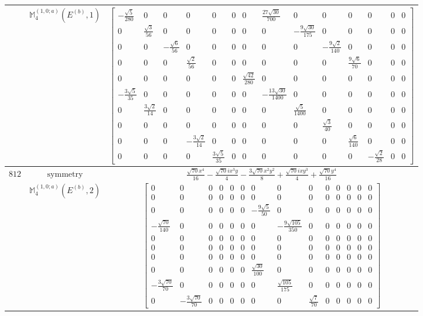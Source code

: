 \documentclass[fleqn,8pt,landscape]{jsarticle}
\begin{document}
\begin{longtable}{ccc}
$  $ & $ \mathbb{M}_{4}^{(1,0;a)}(E^{(b)},1) $ & $ \begin{bmatrix} - \frac{\sqrt{5}}{280} & 0 & 0 & 0 & 0 & 0 & 0 & \frac{27 \sqrt{30}}{700} & 0 & 0 & 0 & 0 & 0 & 0 \\ 0 & \frac{\sqrt{3}}{56} & 0 & 0 & 0 & 0 & 0 & 0 & - \frac{9 \sqrt{30}}{175} & 0 & 0 & 0 & 0 & 0 \\ 0 & 0 & - \frac{\sqrt{6}}{56} & 0 & 0 & 0 & 0 & 0 & 0 & - \frac{9 \sqrt{2}}{140} & 0 & 0 & 0 & 0 \\ 0 & 0 & 0 & \frac{\sqrt{2}}{56} & 0 & 0 & 0 & 0 & 0 & 0 & \frac{9 \sqrt{6}}{70} & 0 & 0 & 0 \\ 0 & 0 & 0 & 0 & 0 & 0 & \frac{\sqrt{42}}{280} & 0 & 0 & 0 & 0 & 0 & 0 & 0 \\ - \frac{3 \sqrt{5}}{35} & 0 & 0 & 0 & 0 & 0 & 0 & - \frac{13 \sqrt{30}}{1400} & 0 & 0 & 0 & 0 & 0 & 0 \\ 0 & \frac{3 \sqrt{2}}{14} & 0 & 0 & 0 & 0 & 0 & 0 & \frac{\sqrt{5}}{1400} & 0 & 0 & 0 & 0 & 0 \\ 0 & 0 & 0 & 0 & 0 & 0 & 0 & 0 & 0 & \frac{\sqrt{3}}{40} & 0 & 0 & 0 & 0 \\ 0 & 0 & 0 & - \frac{3 \sqrt{2}}{14} & 0 & 0 & 0 & 0 & 0 & 0 & \frac{\sqrt{6}}{140} & 0 & 0 & 0 \\ 0 & 0 & 0 & 0 & \frac{3 \sqrt{5}}{35} & 0 & 0 & 0 & 0 & 0 & 0 & - \frac{\sqrt{2}}{28} & 0 & 0 \end{bmatrix} $ \\ \hline
$ 812 $ & $ \text{symmetry} $ & $ \frac{\sqrt{70} x^{4}}{16} - \frac{\sqrt{70} i x^{3} y}{4} - \frac{3 \sqrt{70} x^{2} y^{2}}{8} + \frac{\sqrt{70} i x y^{3}}{4} + \frac{\sqrt{70} y^{4}}{16} $ \\
$  $ & $ \mathbb{M}_{4}^{(1,0;a)}(E^{(b)},2) $ & $ \begin{bmatrix} 0 & 0 & 0 & 0 & 0 & 0 & 0 & 0 & 0 & 0 & 0 & 0 & 0 & 0 \\ 0 & 0 & 0 & 0 & 0 & 0 & 0 & 0 & 0 & 0 & 0 & 0 & 0 & 0 \\ 0 & 0 & 0 & 0 & 0 & 0 & - \frac{9 \sqrt{5}}{50} & 0 & 0 & 0 & 0 & 0 & 0 & 0 \\ - \frac{\sqrt{70}}{140} & 0 & 0 & 0 & 0 & 0 & 0 & - \frac{9 \sqrt{105}}{350} & 0 & 0 & 0 & 0 & 0 & 0 \\ 0 & 0 & 0 & 0 & 0 & 0 & 0 & 0 & 0 & 0 & 0 & 0 & 0 & 0 \\ 0 & 0 & 0 & 0 & 0 & 0 & 0 & 0 & 0 & 0 & 0 & 0 & 0 & 0 \\ 0 & 0 & 0 & 0 & 0 & 0 & 0 & 0 & 0 & 0 & 0 & 0 & 0 & 0 \\ 0 & 0 & 0 & 0 & 0 & 0 & \frac{\sqrt{30}}{100} & 0 & 0 & 0 & 0 & 0 & 0 & 0 \\ - \frac{3 \sqrt{70}}{70} & 0 & 0 & 0 & 0 & 0 & 0 & \frac{\sqrt{105}}{175} & 0 & 0 & 0 & 0 & 0 & 0 \\ 0 & - \frac{3 \sqrt{70}}{70} & 0 & 0 & 0 & 0 & 0 & 0 & \frac{\sqrt{7}}{70} & 0 & 0 & 0 & 0 & 0 \end{bmatrix} $ \\ \hline

\end{longtable}
\end{document}
